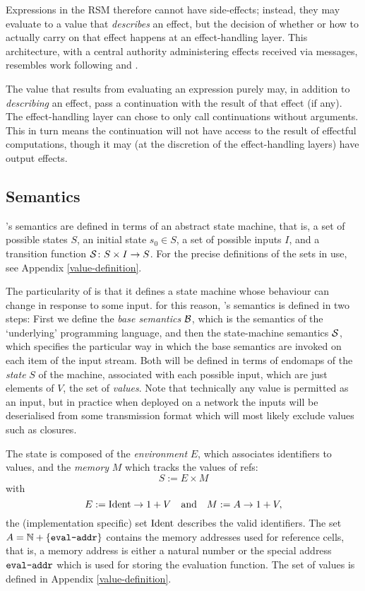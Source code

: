 Expressions in the RSM therefore cannot have
side-effects; instead, they may evaluate to a value that \emph{describes} an effect,
but the decision of whether or how to actually carry on that effect happens at an
effect-handling layer. This architecture, with a central authority
administering effects received via messages, resembles work following
\cite{Cartwright1994} and \cite{Bauer2013}.

The value that results from evaluating an expression purely may, in addition to
\emph{describing} an effect, pass a continuation with the result of that
effect (if any). The effect-handling layer can chose to only call continuations
without arguments. This in turn means the continuation will not have access to
the result of effectful computations, though it may (at the discretion of the
effect-handling layers) have output effects.

\subsection{Semantics}

\rad{}'s semantics are defined in terms of an abstract state machine, that is, a
set of possible states $S$, an initial state $s_0 \in S$, a set of possible
inputs $I$, and a transition function $\S \colon S \times I \to S$.
For the precise definitions of the sets in use, see Appendix
\ref{value-definition}.

The particularity of \rad{} is that it defines a state machine whose behaviour
can change in response to some input. for this reason, \rad{}'s semantics is
defined in two steps: First we define the \emph{base semantics} $\B$, which is
the semantics of the `underlying' programming language, and then the
state-machine semantics $\S$, which specifies the particular way in which the
base semantics are invoked on each item of the input stream. Both will be
defined in terms of endomaps of the \emph{state} $S$ of the machine, associated
with each possible input, which are just elements of $V$, the set of
\emph{values}. Note that technically any value is permitted as an input, but in
practice when deployed on a network the inputs will be deserialised from some
transmission format which will most likely exclude values such as closures.

The state is composed of the \emph{environment} $E$, which associates identifiers to
values, and the \emph{memory} $M$ which tracks the values of refs:
\[
S := E \times M
\]
with
\[
E := \Ident \to 1 + V \quad \text{and} \quad M := A \to 1 + V,
\]
the (implementation specific) set $\Ident$ describes the valid identifiers. The
set $A = \mathbb{N} + \{\evalAddr\}$ contains the memory addresses used for
reference cells, that is, a memory address is either a natural number or the
special address $\evalAddr$ which is used for storing the evaluation function.
The set of values is defined in Appendix \ref{value-definition}.

